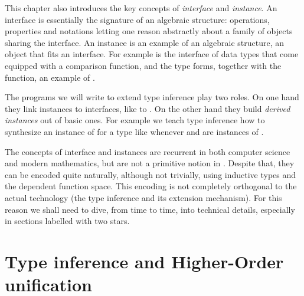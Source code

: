 This chapter also introduces the key concepts of \emph{interface}
and \emph{instance}.  An interface is essentially the signature
of an algebraic structure: operations, properties and notations
letting one reason abstractly about a family of objects sharing
the interface.
An instance is an example of an algebraic structure,
an object that fits an interface.
For example  is the interface of
data types that come equipped with a comparison function, and
the type  forms, together with the  function, an
example of .

The programs we will write to
extend type inference play two roles.  On one hand they link
instances to interfaces, like  to .
On the other hand they build \emph{derived
instances} out of basic ones.  For example we teach type inference
how to synthesize an instance of  for a type like
 whenever  and  are instances of .

The concepts of interface and instances are recurrent in
both computer science and modern mathematics, but are not a primitive
notion in \Coq{}.  Despite that, they can be encoded quite naturally,
although not trivially, using inductive types and the dependent function
space.   This encoding is not completely orthogonal to the
actual technology (the type inference and its extension mechanism).
For this reason we shall need to dive, from time to time, into
technical details, especially in sections labelled with two stars.

\section{Type inference and Higher-Order unification}\label{sec:hounif}

